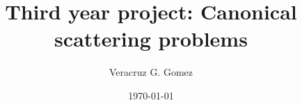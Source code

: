 \title[Canonical Scattering Problems]{Third year project: Canonical scattering problems}

\author{Veracruz G. Gomez}


\date{\today}

\begin{frame}
\titlepage
\end{frame}
